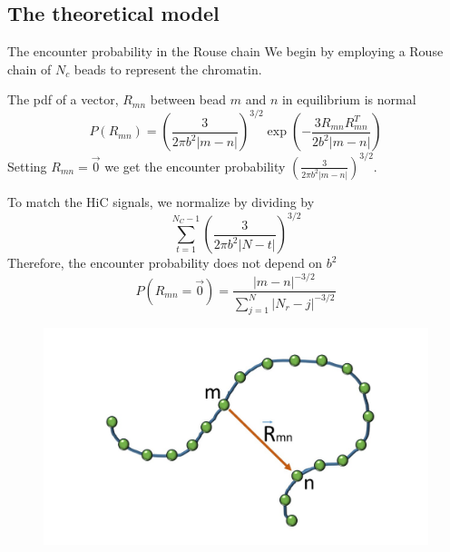 \documentclass[8pt]{beamer}
\begin{document}
\subsection{The theoretical model}\label{subsubsection_theRouseEncounterProbability}
\begin{frame}{The encounter probability in the Rouse chain}
We begin by employing a Rouse chain of $N_c$ beads to represent the chromatin.

The pdf of a vector, $R_{mn}$ between bead $m$ and $n$ in equilibrium is normal
\begin{equation*}
P(R_{mn})=\left(\frac{3}{2\pi b^2 |m-n|}\right)^{3/2}\exp\left(-\frac{3R_{mn}R_{mn}^T}{2b^2|m-n|}\right)
\end{equation*}
Setting $R_{mn}=\vec{0}$ we get the encounter probability 
$\left(\frac{3}{2\pi b^2 |m-n|}\right)^{3/2}$. 

To match the HiC signals, we normalize by dividing by 
\begin{equation*}
\sum_{t=1}^{N_C-1}\left(\frac{3}{2\pi b^2 |N-t|}\right)^{3/2}
\end{equation*}
Therefore, the encounter probability does not depend on $b^2$ 
\begin{equation*}
P(R_{mn}=\vec{0})=\frac{|m-n|^{-3/2}}{\sum_{j=1}^{N} |N_r-j|^{-3/2}}
\end{equation*}

\begin{figure}[H]
\includegraphics[scale=0.12]{rouseChainVectorBetweenMAndN}
\end{figure}
\end{frame}
\end{document}
